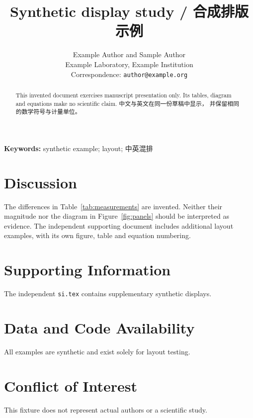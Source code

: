 \documentclass[letterpaper,11pt]{article}
\title{Synthetic display study / 合成排版示例}
\author{Example Author and Sample Author\\
  \small Example Laboratory, Example Institution\\
  \small Correspondence: \texttt{author@example.org}}
\date{}
\begin{document}
\maketitle
\begin{abstract}
This invented document exercises manuscript presentation only. Its tables,
diagram and equations make no scientific claim. 中文与英文在同一份草稿中显示，
并保留相同的数学符号与计量单位。
\end{abstract}

\noindent\textbf{Keywords:} synthetic example; layout; 中英混排




\section{Discussion}\label{sec:discussion}
The differences in Table~\ref{tab:measurements} are invented. Neither their
magnitude nor the diagram in Figure~\ref{fig:panels} should be interpreted as
evidence. The independent supporting document includes additional layout
examples, with its own figure, table and equation numbering.

\section*{Supporting Information}
The independent \texttt{si.tex} contains supplementary synthetic displays.
\section*{Data and Code Availability}
All examples are synthetic and exist solely for layout testing.
\section*{Conflict of Interest}
This fixture does not represent actual authors or a scientific study.


\end{document}
